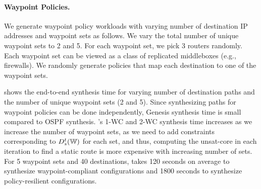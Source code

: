 \begin{figure}
	\begin{center}
	\end{center} 
\end{figure}
\paragraph{Waypoint Policies.}
We generate waypoint policy 
workloads with varying number of destination IP addresses and 
waypoint sets as follows. 
We vary the total number of unique waypoint 
sets to 2 and 5. For each waypoint set, we pick 3 routers randomly.  
Each waypoint set can be 
viewed as a class of replicated middleboxes (e.g., firewalls).
We randomly generate policies that map each destination to one of the waypoint sets. 


 shows the end-to-end synthesis
 time for varying number of destination paths and the 
 number of unique waypoint sets (2 and 5). 
 Since synthesizing paths
 for waypoint policies can be done independently,
Genesis synthesis time is small compared to OSPF synthesis. 
\name's 1-WC and 2-WC synthesis 
time increases as we increase the number of waypoint sets,
as we need to add constraints corresponding to $D_s^t(\mathbb{W})$ 
for each set, and thus, computing the unsat-core in each
iteration to find a static route is more expensive with increasing
number of sets. 
For 5 waypoint sets and 40 destinations, \name takes 120 
seconds on average to synthesize waypoint-compliant configurations
and 1800 seconds to synthesize policy-resilient configurations.



